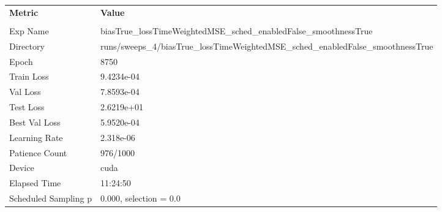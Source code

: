 \begin{tabular}{|l|l|}
\hline
\textbf{Metric} & \textbf{Value} \\\\
Exp Name & biasTrue_lossTimeWeightedMSE_sched_enabledFalse_smoothnessTrue \\ 
Directory & runs/sweeps_4/biasTrue_lossTimeWeightedMSE_sched_enabledFalse_smoothnessTrue \\ 
Epoch & 8750 \\ 
Train Loss & 9.4234e-04 \\ 
Val Loss & 7.8593e-04 \\ 
Test Loss & 2.6219e+01 \\ 
Best Val Loss & 5.9520e-04 \\ 
Learning Rate & 2.318e-06 \\ 
Patience Count & 976/1000 \\ 
Device & cuda \\ 
Elapsed Time & 11:24:50 \\ 
Scheduled Sampling p & 0.000, selection = 0.0 \\ 
\hline
\end{tabular}